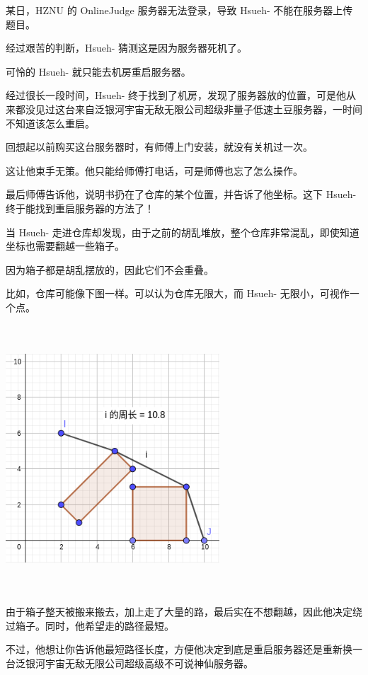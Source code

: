 某日，HZNU 的 OnlineJudge 服务器无法登录，导致 Hsueh- 不能在服务器上传题目。

经过艰苦的判断，Hsueh- 猜测这是因为服务器死机了。

可怜的 Hsueh- 就只能去机房重启服务器。

经过很长一段时间，Hsueh- 终于找到了机房，发现了服务器放的位置，可是他从来都没见过这台来自泛银河宇宙无敌无限公司超级非量子低速土豆服务器，一时间不知道该怎么重启。

回想起以前购买这台服务器时，有师傅上门安装，就没有关机过一次。

这让他束手无策。他只能给师傅打电话，可是师傅也忘了怎么操作。

最后师傅告诉他，说明书扔在了仓库的某个位置，并告诉了他坐标。这下 Hsueh- 终于能找到重启服务器的方法了！

当 Hsueh- 走进仓库却发现，由于之前的胡乱堆放，整个仓库非常混乱，即使知道坐标也需要翻越一些箱子。

因为箱子都是胡乱摆放的，因此它们不会重叠。

比如，仓库可能像下图一样。可以认为仓库无限大，而 Hsueh- 无限小，可视作一个点。

\begin{center}
\includegraphics[width=8cm,height=10cm,natwidth=320,natheight=360]{data1.png} %
\end{center}


由于箱子整天被搬来搬去，加上走了大量的路，最后实在不想翻越，因此他决定绕过箱子。同时，他希望走的路径最短。

不过，他想让你告诉他最短路径长度，方便他决定到底是重启服务器还是重新换一台泛银河宇宙无敌无限公司超级高级不可说神仙服务器。

